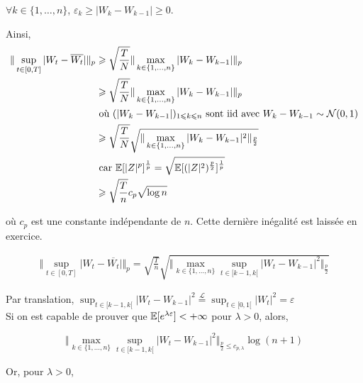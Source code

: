 $\forall k \in \{ 1, \ldots, n \}$, $\varepsilon_k \geq \vert W_k - W_{k-1} \vert \geq 0$.

Ainsi,
\renewcommand{\wtk}{W_{t_k^n}}
\begin{equation*}
\begin{split}
  \Vert \sup_{t \in [0,T]} \vert W_t - \overline{W_t} \vert \Vert_p &\geqslant \sqrt{ \frac{T}{N} } \Vert \max_{k \in \{ 1, \ldots, n \}} \vert W_k - W_{k-1} \vert \Vert_p \\
  &\geqslant \sqrt{ \frac{T}{N} } \Vert \max_{k \in \{ 1, \ldots, n \}} \vert W_k - W_{k-1} \vert \Vert_p \\
  &\text{ où } (\vert W_k - W_{k-1} \vert)_{1 \leqslant k \leqslant n} \text{ sont iid avec } W_k - W_{k-1} \sim \mathcal{N}(0,1)\\
  &\geqslant \sqrt{ \frac{T}{N} } \sqrt{ \Vert \max_{k \in \{ 1, \ldots, n \}} \vert W_k - W_{k-1} \vert^2 \Vert_{ \frac{p}{2} }} \\
  &\text{ car } \mathbb{E}[\vert Z \vert^p]^{ \frac{1}{p}} = \sqrt{\mathbb{E}[(\vert Z \vert^2)^\frac{p}{2}]^{\frac{1}{p}}} \\
  &\geqslant \sqrt{ \frac{T}{n} } c_p \sqrt{\log n} 
\end{split}
\end{equation*}

où $c_p$ est une constante indépendante de $n$. Cette dernière inégalité est laissée en exercice. \\


\begin{equation*}
\begin{split}
  \Vert \sup_{t \in [0,T]} \vert W_t - \overline{W_t} \vert \Vert_p = \sqrt{ \frac{T}{n} } \sqrt{\Vert \max_{k \in \{ 1, \ldots, n\} } \sup_{t \in [k-1,k[} \vert W_t - W_{k-1} \vert^2 \Vert_{ \frac{p}{2}} }
\end{split}
\end{equation*}

Par translation, $\sup_{t \in [k-1,k[} \vert W_t - W_{k-1} \vert^2 \stackrel{\mathcal{L}}{=} \sup_{t \in [0,1[} \vert W_t\vert^2 = \varepsilon$\\

Si on est capable de prouver que $\mathbb{E}[e^{\lambda \varepsilon}] < +\infty$ pour $\lambda>0$, alors,

\[ \Vert \max_{k\in \{1,\ldots,n\}} \sup_{t \in [k-1,k[} \vert W_t -W_{k-1} \vert^2 \Vert_{ \frac{p}{2} \leq c_{p,\lambda} } \log(n+1) \]


Or, pour $\lambda > 0$,

